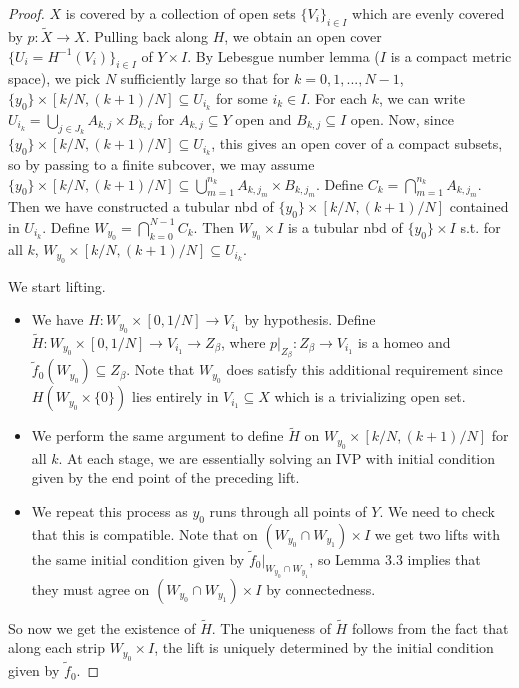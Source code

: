 \documentclass{article}
\theoremstyle{definition}
\theoremstyle{remark}
\theoremstyle{plain}
\begin{document}
\begin{proof}
    $X$ is covered by a collection of open sets $\{V_{i}\}_{i\in I}$ which are evenly covered by $p:\tilde X\to X$. Pulling back along $H$, we obtain an open cover $\{U_i=H^{-1}(V_i)\}_{i\in I}$ of $Y\times I$. By Lebesgue number lemma ($I$ is a compact metric space), we pick $N$ sufficiently large so that for $k=0,1,...,N-1$, $\{y_0\}\times[k/N,(k+1)/N]\subseteq U_{i_k}$ for some $i_k\in I$. For each $k$, we can write $U_{i_k}=\bigcup_{j\in J_k}A_{k,j}\times B_{k,j}$ for $A_{k,j}\subseteq Y$ open and $B_{k,j}\subseteq I$ open. Now, since $\{y_0\}\times[k/N,(k+1)/N]\subseteq U_{i_k}$, this gives an open cover of a compact subsets, so by passing to a finite subcover, we may assume $\{y_0\}\times[k/N,(k+1)/N]\subseteq\bigcup_{m=1}^{n_k}A_{k,j_m}\times B_{k,j_m}$. Define $C_k=\bigcap_{m=1}^{n_k}A_{k,j_m}$. Then we have constructed a tubular nbd of $\{y_0\}\times [k/N,(k+1)/N]$ contained in $U_{i_k}$. Define $W_{y_0}=\bigcap_{k=0}^{N-1}C_k$. Then $W_{y_0}\times I$ is a tubular nbd of $\{y_0\}\times I$ s.t. for all $k$, $W_{y_0}\times [k/N,(k+1)/N]\subseteq U_{i_k}$. 

    We start lifting. 
    \begin{itemize}
        \item We have $H:W_{y_0}\times[0,1/N]\to V_{i_1}$ by hypothesis. Define $\tilde H:W_{y_0}\times[0,1/N]\to V_{i_1}\to Z_\beta$, where $p|_{Z_\beta}:Z_\beta\to V_{i_1}$ is a homeo and $\tilde f_0(W_{y_0})\subseteq Z_\beta$. Note that $W_{y_0}$ does satisfy this additional requirement since $H(W_{y_0}\times\{0\})$ lies entirely in $V_{i_1}\subseteq X$ which is a trivializing open set.
        \item We perform the same argument to define $\tilde H$ on $W_{y_0}\times [k/N,(k+1)/N]$ for all $k$. At each stage, we are essentially solving an IVP with initial condition given by the end point of the preceding lift.
        \item We repeat this process as $y_0$ runs through all points of $Y$. We need to check that this is compatible. Note that on $(W_{y_0}\cap W_{y_1})\times I$ we get two lifts with the same initial condition given by $\tilde f_0|_{W_{y_0}\cap W_{y_1}}$, so Lemma 3.3 implies that they must agree on $(W_{y_0}\cap W_{y_1})\times I$ by connectedness.
    \end{itemize}
    So now we get the existence of $\tilde H$. The uniqueness of $\tilde H$ follows from the fact that along each strip $W_{y_0}\times I$, the lift is uniquely determined by the initial condition given by $\tilde f_0$.
\end{proof}
\end{document}
